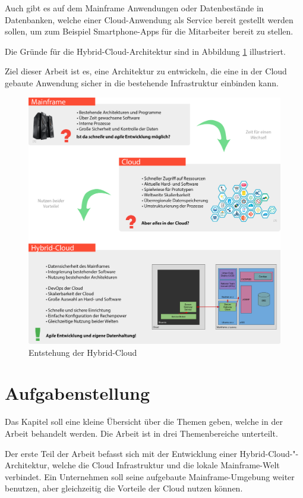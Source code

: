 Auch gibt es auf dem Mainframe Anwendungen oder Datenbestände in Datenbanken, welche einer Cloud-Anwendung als Service
bereit gestellt werden sollen, um zum Beispiel Smartphone-Apps  für die Mitarbeiter bereit zu stellen.

Die Gründe für die Hybrid-Cloud-Architektur sind in Abbildung \ref{fig:plakat} illustriert.

Ziel dieser Arbeit ist es, eine Architektur zu entwickeln, die eine in der Cloud gebaute Anwendung sicher in die bestehende
Infrastruktur einbinden kann.

\begin{figure}[h]
  \centering
    \includegraphics[scale=0.104]{images/kapitel_1/plakat.png}
  \caption{Entstehung der Hybrid-Cloud}
  \label{fig:plakat}
\end{figure}

\newpage

\section{Aufgabenstellung}
Das Kapitel soll eine kleine Übersicht über die Themen geben, welche in der Arbeit behandelt werden. Die Arbeit ist
in drei Themenbereiche unterteilt.

Der erste Teil der Arbeit befasst sich mit der Entwicklung einer Hybrid-Cloud-"-Architektur, welche die Cloud Infrastruktur
und die lokale Mainframe-Welt verbindet. Ein Unternehmen soll seine aufgebaute Mainframe-Umgebung weiter benutzen, aber
gleichzeitig die Vorteile der Cloud nutzen können.

